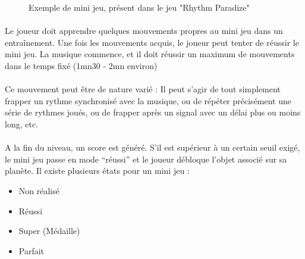 \begin{figure}[H]\centering
  \caption{Exemple de mini jeu, présent dans le jeu "Rhythm Paradize"}
  \label{rhythmParadise}
\end{figure}

\paragraph{} Le joueur doit apprendre quelques mouvements propres au mini jeu dans un entraînement. Une fois les mouvements acquis, le joueur peut tenter de réussir le mini jeu. La musique commence, et il doit réussir un maximum de mouvements dans le temps fixé (1mn30 - 2mn environ)
\paragraph{} Ce mouvement peut être de nature varié : Il peut s’agir de tout simplement frapper un rythme synchronisé avec la musique, ou de répéter précisément une série de rythmes joués, ou de frapper après un signal avec un délai plus ou moins long, etc.
\paragraph{} A la fin du niveau, un score est généré. S’il est supérieur à un certain seuil exigé, le mini jeu passe en mode “réussi” et le joueur débloque l’objet associé sur sa planète.
Il existe plusieurs états pour un mini jeu :
\begin{itemize}
\item Non réalisé
\item Réussi
\item Super (Médaille)
\item Parfait
\end{itemize}
